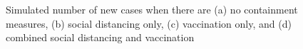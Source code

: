\documentclass[12pt]{article}
\begin{document}
\begin{figure}[!htb]%
\caption
{Simulated number of new cases when there are (a) no containment measures, (b) social distancing only, (c) vaccination only, and (d) combined social distancing and vaccination}%
\label{fig: dist_vacc}%
\vspace{-0.2cm}%
\footnotesize



\end{figure}
\end{document}
